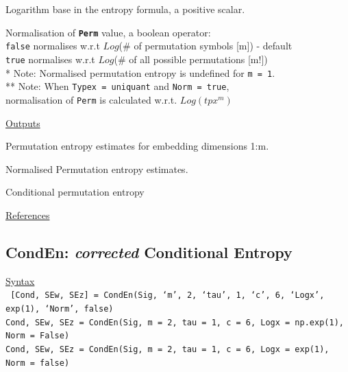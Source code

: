 \documentclass[12pt, a4paper, titlepage, openany]{book}
\begin{document}
\begin{description}[labelsep=1cm, labelwidth=2cm, nosep, style=multiline,leftmargin=3cm]
\item[\texttt{Logx}]	Logarithm base in the entropy formula, a positive scalar.
\item[\texttt{Norm}]    Normalisation of \texttt{\textbf{Perm}} value, a boolean operator:\\
					\texttt{false} \hspace{10pt} normalises w.r.t $Log$($\#$ of permutation symbols [m]) - default\\
     		  		\texttt{true} \hspace{15pt} normalises w.r.t $Log$($\#$ of all possible permutations [m!])\\
     		  			* Note: Normalised permutation entropy is undefined for \texttt{m = 1}.\\
     		  			** Note: When \texttt{Typex = uniquant} and \texttt{Norm = true},\\ 									normalisation of \texttt{Perm} is calculated w.r.t. $Log(tpx^m)$
\end{description}

\noindent \ul{Outputs}
\begin{description}[labelsep=1cm, labelwidth=2cm, nosep, style=multiline,leftmargin=3cm]\footnotesize
\item[\texttt{Perm}]	Permutation entropy estimates for embedding dimensions 1:m.
\item[\texttt{Pnorm}]	Normalised Permutation entropy estimates.
\item[\texttt{cPE}]		Conditional permutation entropy \cite{Perm8}
\end{description}

\noindent \ul{References}\hspace{1cm}
\cite{Perm1} \cite{Perm2} \cite{Perm3} \cite{Perm4} \cite{Perm5} \cite{Perm6} \cite{Perm7} \cite{Perm8}



\newpage
\subsection{\normalsize CondEn: \hspace{15mm} \textit{corrected} Conditional Entropy}
\noindent\ul{Syntax} \vspace{6mm} \\ \noindent \texttt{\footnotesize
[Cond, SEw, SEz] = CondEn(Sig, ‘m’, 2, ‘tau’, 1, ‘c’, 6, ‘Logx’, exp(1), ‘Norm’, false)\\
 Cond, SEw, SEz  = CondEn(Sig, m = 2, tau = 1, c = 6, Logx = np.exp(1), Norm = False) \\
Cond, SEw, SEz  = CondEn(Sig, m = 2, tau = 1, c = 6, Logx = exp(1), Norm = false)}
\end{document}
